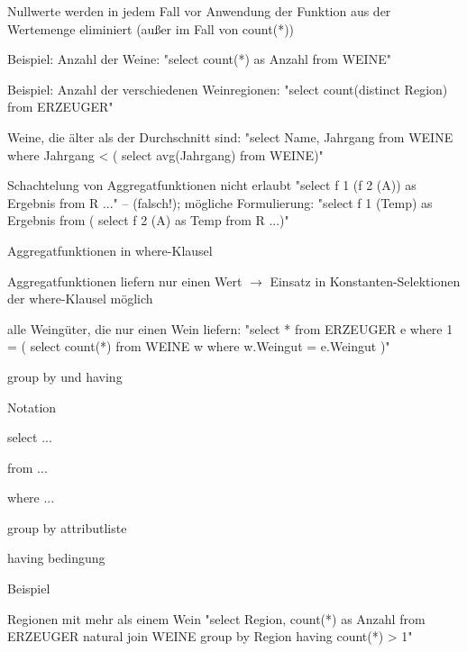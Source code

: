 \documentclass[a4paper]{article}
\begin{document}
\begin{multicols}{3}
\begin{itemize*}
\begin{itemize*}
        \item Nullwerte werden in jedem Fall vor Anwendung der Funktion aus der Wertemenge eliminiert (außer im Fall von count(*))
    \end{itemize*}
    \item Beispiel: Anzahl der Weine:
    "select count(*) as Anzahl from WEINE"
    \item Beispiel: Anzahl der verschiedenen Weinregionen:
    "select count(distinct Region) from ERZEUGER"
    \item Weine, die älter als der Durchschnitt sind:
    "select Name, Jahrgang from WEINE where Jahrgang < ( select avg(Jahrgang) from WEINE)"
    \item Schachtelung von Aggregatfunktionen nicht erlaubt
    "select f 1 (f 2 (A)) as Ergebnis from R ..." -- (falsch!);
    mögliche Formulierung: "select f 1 (Temp) as Ergebnis from ( select f 2 (A) as Temp from R ...)"
    \item Aggregatfunktionen in where-Klausel
    \begin{itemize*}
        \item Aggregatfunktionen liefern nur einen Wert $\rightarrow$ Einsatz in Konstanten-Selektionen der where-Klausel möglich
        \item alle Weingüter, die nur einen Wein liefern:
        "select * from ERZEUGER e where 1 = ( select count(*) from WEINE w where w.Weingut = e.Weingut )"
    \end{itemize*}
    \item group by und having
    \begin{itemize*}
        \item Notation
        \begin{itemize*}
            \item select ...
            \item from ...
            \item [where ...]
            \item [group by attributliste ]
            \item [having bedingung ]
        \end{itemize*}
        \item Beispiel
        \begin{itemize*}
            \item Regionen mit mehr als einem Wein
            "select Region, count(*) as Anzahl from ERZEUGER natural join WEINE group by Region having count(*) > 1"
        \end{itemize*}
    \end{itemize*}
\end{itemize*}


\end{multicols}
\end{document}
